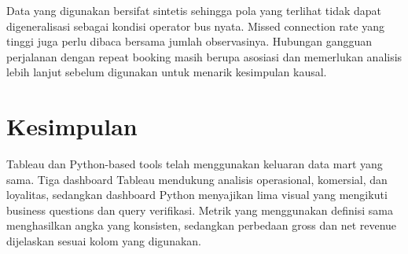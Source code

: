 Data yang digunakan bersifat sintetis sehingga pola yang terlihat tidak dapat
digeneralisasi sebagai kondisi operator bus nyata. Missed connection rate yang
tinggi juga perlu dibaca bersama jumlah observasinya. Hubungan gangguan perjalanan
dengan repeat booking masih berupa asosiasi dan memerlukan analisis lebih lanjut
sebelum digunakan untuk menarik kesimpulan kausal.

\section{Kesimpulan}

Tableau dan Python-based tools telah menggunakan keluaran data mart yang sama.
Tiga dashboard Tableau mendukung analisis operasional, komersial, dan loyalitas,
sedangkan dashboard Python menyajikan lima visual yang mengikuti business
questions dan query verifikasi. Metrik yang menggunakan definisi sama menghasilkan
angka yang konsisten, sedangkan perbedaan gross dan net revenue dijelaskan sesuai
kolom yang digunakan.
